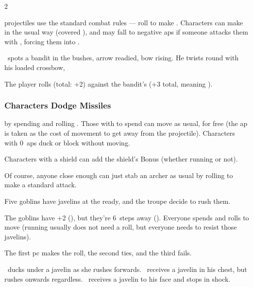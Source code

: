 \begin{multicols}{2}

\noindent
\Glspl{projectile} use the standard combat rules --- roll  to make .
Characters can make  in the usual way (covered ),
and may fall to negative \glspl{ap} if someone attacks them with , forcing them into .

\begin{exampletext}
  \composeHumanName\ spots a bandit in the bushes, arrow readied, bow rising.
  He twists round with his loaded crossbow,

  {\sffamily
    The player rolls  (total: +2) against the bandit's   (+3 total, meaning \tn[10]).
  }
\end{exampletext}

\null

\subsubsection{Characters Dodge Missiles}
by spending  and rolling .
Those with  to spend can move as usual, for free (the \gls{ap} is taken as the cost of movement to get away from the projectile).
Characters with 0~\glspl{ap} duck or block without moving.

Characters with a shield can add the shield's Bonus (whether \gls{running} or not).

Of course, anyone close enough can just stab an archer as usual by rolling  to make a standard attack.

\begin{exampletext}
  Five goblins have javelins at the ready, and the troupe decide to rush them.

  {\sffamily
    The goblins have  +2 (\tn[9]), but they're 6~\glspl{step} away (\tn[8]).
    Everyone spends  and rolls  to move (\gls{running} usually does not need a roll, but everyone needs to resist those javelins).

    The first \gls{pc} makes the roll, the second ties, and the third fails.
  }

  \composeHumanName\ ducks under a javelin as she rushes forwards.
  \composeHumanName\ receives a javelin in his chest, but rushes onwards regardless.
  \composeHumanName\ receives a javelin to his face and stops in shock.
\end{exampletext}


\end{multicols}
